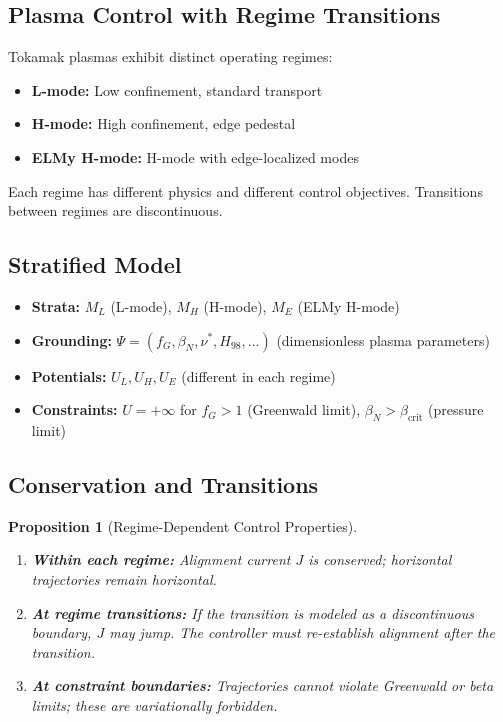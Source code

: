 \documentclass[11pt,a4paper]{article}
\newtheorem{proposition}[theorem]{Proposition}
\begin{document}
\subsection{Plasma Control with Regime Transitions}

Tokamak plasmas exhibit distinct operating regimes:
\begin{itemize}
    \item \textbf{L-mode:} Low confinement, standard transport
    \item \textbf{H-mode:} High confinement, edge pedestal
    \item \textbf{ELMy H-mode:} H-mode with edge-localized modes
\end{itemize}

Each regime has different physics and different control objectives. Transitions between regimes are discontinuous.

\subsection{Stratified Model}

\begin{itemize}
    \item \textbf{Strata:} $M_L$ (L-mode), $M_H$ (H-mode), $M_E$ (ELMy H-mode)
    \item \textbf{Grounding:} $\Psi = (f_G, \beta_N, \nu^*, H_{98}, \ldots)$ (dimensionless plasma parameters)
    \item \textbf{Potentials:} $U_L, U_H, U_E$ (different in each regime)
    \item \textbf{Constraints:} $U = +\infty$ for $f_G > 1$ (Greenwald limit), $\beta_N > \beta_{\mathrm{crit}}$ (pressure limit)
\end{itemize}

\subsection{Conservation and Transitions}

\begin{proposition}[Regime-Dependent Control Properties]\leavevmode
\begin{enumerate}
    \item \textbf{Within each regime:} Alignment current $J$ is conserved; horizontal trajectories remain horizontal.
    \item \textbf{At regime transitions:} If the transition is modeled as a discontinuous boundary, $J$ may jump. The controller must re-establish alignment after the transition.
    \item \textbf{At constraint boundaries:} Trajectories cannot violate Greenwald or beta limits; these are variationally forbidden.
\end{enumerate}
\end{proposition}
\end{document}
